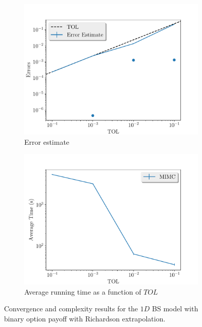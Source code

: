 \documentclass[11pt]{article}
\begin{document}
\begin{figure}[!h]
	\centering
	\begin{subfigure}{.5\textwidth}
		\centering
		\includegraphics[width=1\linewidth]{./figures/binary_8_16_steps/error_estimate.pdf}
		\caption{Error estimate}
		\label{fig:misc_binary_8_16_steps_sub1}
	\end{subfigure}%
	\begin{subfigure}{.5\textwidth}
		\centering
		\includegraphics[width=1\linewidth]{./figures/binary_8_16_steps/average_running_time.pdf}
		\caption{Average running time as a function of $TOL$}
		\label{fig:misc_binary_8_16_steps_sub2}
	\end{subfigure}%
	\caption{Convergence and complexity results for the $1D$ BS model with binary option payoff with Richardson extrapolation.}
	\label{fig:misc_binary_8_16_steps_1}
\end{figure}
\end{document}
